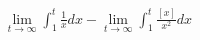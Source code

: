 \documentclass[preview]{standalone}
\begin{document}
\begin{align*}
\lim_{t\to\infty}\int_{1}^{t}\frac{1}{x}dx - \lim_{t\to\infty}\int_{1}^{t}\frac{[x]}{x^2}dx
\end{align*}
\end{document}

